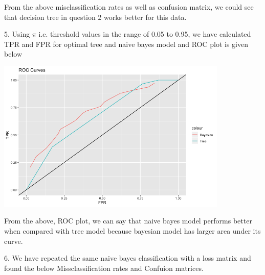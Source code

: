 \documentclass[a4paper,10pt]{article}
\begin{document}
From the above misclassification rates as well as confusion matrix, we could see that decision tree in question 2 works better for this data. \par
\vspace{0.5cm}
5. Using $\pi$ i.e. threshold values in the range of 0.05 to 0.95, we have calculated TPR and FPR for optimal tree and naive bayes model and ROC plot is given below \par
\begin{center}
  \includegraphics[width=110mm,scale=0.10]{ROC_AUC_Curve.png} 
\end{center}
From the above, ROC plot, we can say that naive bayes model performs better when compared with tree model because bayesian model has larger area under its curve.
\par
\vspace{0.5cm}
6. We have repeated the same naive bayes classification with a loss matrix and found the below Missclassification rates and Confuion matrices.\par
\end{document}
